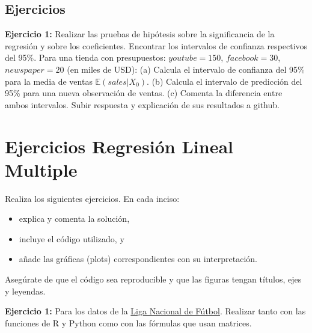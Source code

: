 \documentclass[
]{book}
\begin{document}
\subsection{Ejercicios}\label{ejercicios-1}

\textbf{Ejercicio 1:} Realizar las pruebas de hipótesis sobre la significancia de la regresión y sobre los coeficientes. Encontrar los intervalos de confianza respectivos del 95\%.
Para una tienda con presupuestos:
\(youtube = 150\), \(facebook = 30\), \(newspaper=20\) (en miles de USD):
(a) Calcula el intervalo de confianza del 95\% para la media de ventas \(\mathbb{E}(sales | X_0)\).
(b) Calcula el intervalo de predicción del 95\% para una nueva observación de ventas.
(c) Comenta la diferencia entre ambos intervalos.
Subir respuesta y explicación de sus resultados a github.

\section{Ejercicios Regresión Lineal Multiple}\label{ejercicios-regresiuxf3n-lineal-multiple}

Realiza los siguientes ejercicios. En cada inciso:

\begin{itemize}
\item
  explica y comenta la solución,
\item
  incluye el código utilizado, y
\item
  añade las gráficas (plots) correspondientes con su interpretación.
\end{itemize}

Asegúrate de que el código sea reproducible y que las figuras tengan títulos, ejes y leyendas.

\textbf{Ejercicio 1:} Para los datos de la \href{https://github.com/HaydeePeruyero/MultivariateStatisticalAnalysis/tree/main/data/Liga_nacional_de_futbol.csv}{Liga Nacional de Fútbol}. Realizar tanto con las funciones de R y Python como con las fórmulas que usan matrices.
\end{document}
